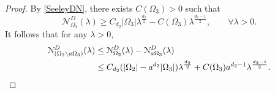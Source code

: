 \documentclass[11pt,letterpaper]{amsart}
\numberwithin{equation}{section}
\theoremstyle{plain}
\theoremstyle{plain}
\numberwithin{equation}{section}
\theoremstyle{remark}
\begin{document}
\begin{proof}
	By \eqref{SeeleyDN}, there exists $C(\Omega_3)>0$ such that 
	\begin{equation}\label{re2}
		\mathcal N^D_{\Omega_3}(\lambda) \ge C_{d_2}|\Omega_3| \lambda^{\frac {d_2} 2} - C(\Omega_3) \lambda^{\frac{d_2-1}{2}},\qquad \forall \lambda>0.
	\end{equation}
	It follows that  for any  $\lambda>0$,
	\[
	\aligned
	\mathcal N^D_{(\Omega_2\setminus a\Omega_3)}(\lambda) 
	& \leq \mathcal N^D_{\Omega_2}(\lambda)- \mathcal N^D_{a\Omega_3} (\lambda)%
	\\&
	\le C_{d_2}(|\Omega_2|-a^{d_2}|\Omega_3|)\lambda^{\frac{d_2} 2}+ C(\Omega_3)a^{d_2-1}\lambda^{\frac{d_2-1}{2}}.
	\endaligned
	\]
	

\end{proof}
\end{document}
